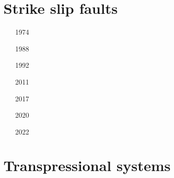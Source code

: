 \section{Strike slip faults} 

\begin{scriptsize}
\begin{itemize}
\item[1974]
\item[1988]
\item[1992]
\item[2011]
\item[2017]
\item[2020]
\item[2022]
\end{itemize}
\end{scriptsize}

\section{Transpressional systems} 

\begin{scriptsize}
\begin{itemize}
\item[\nineteenninetythree] 
\item[\nineteenninetyfour] 
\item[\nineteenninetyseven] 
\item[\twothousandthree] 
\\
\item[\twothousandeleven] 
\item[\twothousandseventeen] 
\\
\item[\twothousandeighteen] 
\end{itemize}
\end{scriptsize}

